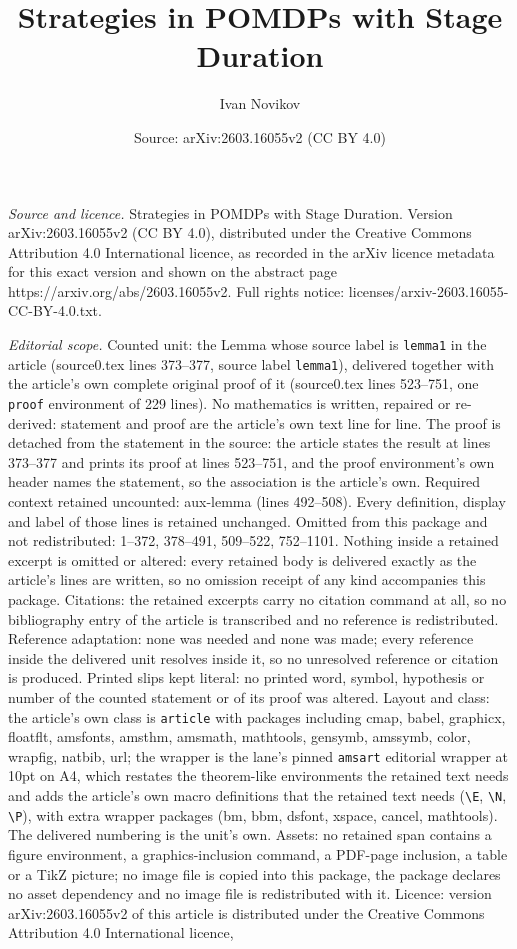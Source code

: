 \documentclass[10pt,a4paper]{amsart}
\title[Strategies in POMDPs with Stage Duration]{Strategies in POMDPs with Stage Duration}
\author{Ivan Novikov}
\date{Source: arXiv:2603.16055v2 (CC BY 4.0)}
\begin{document}
\maketitle

\noindent\emph{Source and licence.} Strategies in POMDPs with Stage Duration. Version arXiv:2603.16055v2 (CC BY 4.0), distributed under the Creative Commons Attribution 4.0 International licence, as recorded in the arXiv licence metadata for this exact version and shown on the abstract page https://arxiv.org/abs/2603.16055v2. Full rights notice: licenses/arxiv-2603.16055-CC-BY-4.0.txt.\par\smallskip

\noindent\textit{Editorial scope.} Counted unit: the Lemma whose source label is \texttt{lemma1} in the article (source0.tex lines 373--377, source label \texttt{lemma1}), delivered together with the article's own complete original proof of it (source0.tex lines 523--751, one \texttt{proof} environment of 229 lines). No mathematics is written, repaired or re-derived: statement and proof are the article's own text line for line. The proof is detached from the statement in the source: the article states the result at lines 373--377 and prints its proof at lines 523--751, and the proof environment's own header names the statement, so the association is the article's own. Required context retained uncounted: aux-lemma (lines 492--508). Every definition, display and label of those lines is retained unchanged. Omitted from this package and not redistributed: 1--372, 378--491, 509--522, 752--1101. Nothing inside a retained excerpt is omitted or altered: every retained body is delivered exactly as the article's lines are written, so no omission receipt of any kind accompanies this package. Citations: the retained excerpts carry no citation command at all, so no bibliography entry of the article is transcribed and no reference is redistributed. Reference adaptation: none was needed and none was made; every reference inside the delivered unit resolves inside it, so no unresolved reference or citation is produced. Printed slips kept literal: no printed word, symbol, hypothesis or number of the counted statement or of its proof was altered. Layout and class: the article's own class is \texttt{article} with packages including cmap, babel, graphicx, floatflt, amsfonts, amsthm, amsmath, mathtools, gensymb, amssymb, color, wrapfig, natbib, url; the wrapper is the lane's pinned \texttt{amsart} editorial wrapper at 10pt on A4, which restates the theorem-like environments the retained text needs and adds the article's own macro definitions that the retained text needs (\texttt{\textbackslash E}, \texttt{\textbackslash N}, \texttt{\textbackslash P}), with extra wrapper packages (bm, bbm, dsfont, xspace, cancel, mathtools). The delivered numbering is the unit's own. Assets: no retained span contains a figure environment, a graphics-inclusion command, a PDF-page inclusion, a table or a TikZ picture; no image file is copied into this package, the package declares no asset dependency and no image file is redistributed with it. Licence: version arXiv:2603.16055v2 of this article is distributed under the Creative Commons Attribution 4.0 International licence, 
\end{document}
